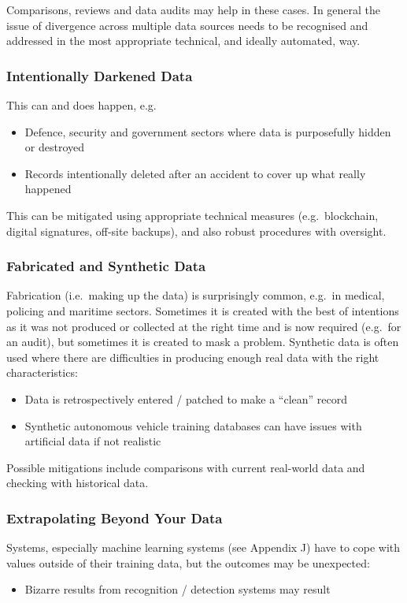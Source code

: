 Comparisons, reviews and data audits may help in these cases. In general the issue of divergence across multiple data sources needs to be recognised and addressed in the most appropriate technical, and ideally automated, way.

\subsubsection{Intentionally Darkened Data}\label{bkm:dark13}
This can and does happen, e.g.
\begin{itemize}
\item Defence, security and government sectors where data is purposefully hidden or destroyed
  \item Records intentionally deleted after an accident to cover up what really happened
\end{itemize}

This can be mitigated using appropriate technical measures (e.g.\ blockchain, digital signatures, off-site backups), and also robust procedures with oversight.

\subsubsection{Fabricated and Synthetic Data}\label{bkm:dark14}
Fabrication (i.e.\ making up the data) is surprisingly common, e.g.\ in medical, policing and maritime sectors. Sometimes it is created with the best of intentions as it was not produced or collected at the right time and is now required (e.g.\ for an audit), but sometimes it is created to mask a problem. Synthetic data is often used where there are difficulties in producing enough real data with the right characteristics:
\begin{itemize}
\item Data is retrospectively entered / patched to make a “clean” record
  \item Synthetic autonomous vehicle training \glspl{database} can have issues with artificial data if not realistic
\end{itemize}

Possible mitigations include comparisons with current real-world data and checking with historical data.

\subsubsection{Extrapolating Beyond Your Data}\label{bkm:dark15}
Systems, especially machine learning systems (see Appendix J) have to cope with values outside of their training data, but the outcomes may be unexpected:
\begin{itemize}
\item Bizarre results from recognition / detection systems may result
\end{itemize}

